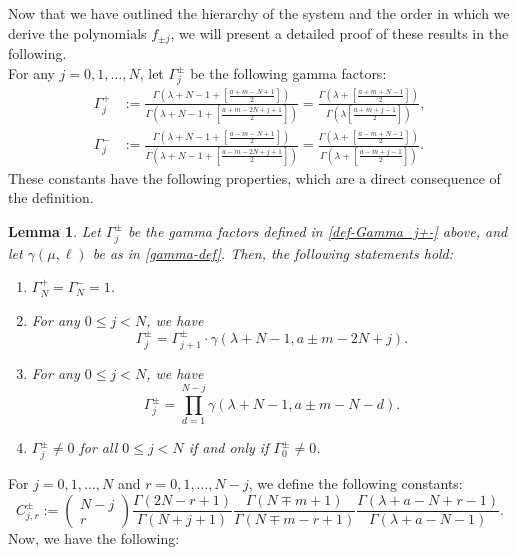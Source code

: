 \documentclass[12pt, pdflatex, a4paper]{article}
\theoremstyle{plain}
\newtheorem{lemma}[thm]{Lemma}
\theoremstyle{definition}
\begin{document}
Now that we have outlined the hierarchy of the system and the order in which we derive the polynomials $f_{\pm j}$, we will present a detailed proof of these results in the following.\\

For any $j = 0, 1, \ldots, N$, let $\Gamma_j^\pm$ be the following gamma factors:
\begin{equation}\label{def-Gamma_j+-}
\begin{aligned}
\Gamma_j^+ &:= \frac{\Gamma\left(\lambda+N-1+\left[\frac{a+m-N+1}{2}\right]\right)}{\Gamma\left(\lambda+N-1+\left[\frac{a+m-2N+j+1}{2}\right]\right)} = \frac{\Gamma\left(\lambda+\left[\frac{a+m+N-1}{2}\right]\right)}{\Gamma\left(\lambda\left[\frac{a+m+j-1}{2}\right]\right)},\\[4pt]
\Gamma_j^- &:= \frac{\Gamma\left(\lambda+N-1+\left[\frac{a-m-N+1}{2}\right]\right)}{\Gamma\left(\lambda+N-1+\left[\frac{a-m-2N+j+1}{2}\right]\right)} = \frac{\Gamma\left(\lambda+\left[\frac{a-m+N-1}{2}\right]\right)}{\Gamma\left(\lambda+\left[\frac{a-m+j-1}{2}\right]\right)}.
\end{aligned}
\end{equation}
These constants have the following properties, which are a direct consequence of the definition.

\begin{lemma}\label{lemma-Gamma_j+-} Let $\Gamma_j^\pm$ be the gamma factors defined in \eqref{def-Gamma_j+-} above, and let $\gamma(\mu, \ell)$ be as in \eqref{gamma-def}. Then, the following statements hold:
\begin{enumerate}[label=\normalfont{(\arabic*)}]
\item $\Gamma_N^+ = \Gamma_N^- = 1$.
\item For any $0 \leq j < N$, we have
\begin{equation*}
\Gamma_j^\pm = \Gamma_{j+1}^\pm \cdot \gamma(\lambda+N-1, a\pm m-2N+j).
\end{equation*}
\item For any $0 \leq j < N$, we have 
\begin{equation*}
\Gamma_j^\pm = \prod_{d=1}^{N-j}\gamma(\lambda+N-1, a\pm m-N-d).
\end{equation*}
\item $\Gamma_j^\pm \neq 0$ for all $0 \leq j < N$ if and only if $\Gamma_0^\pm \neq 0$.
\end{enumerate}
\end{lemma}


For $j = 0, 1, \dots, N$ and $r = 0, 1, \ldots, N-j$, we define the following constants:
\begin{equation}\label{definition-constants-Cjr+-}
C_{j, r}^\pm := \begin{pmatrix}
N-j\\
r
\end{pmatrix}
\frac{\Gamma(2N-r+1)}{\Gamma(N+j+1)}
\frac{\Gamma(N\mp m+1)}{\Gamma(N\mp m -r +1)}
\frac{\Gamma(\lambda+a-N+r-1)}{\Gamma(\lambda+a-N-1)}.
\end{equation}
Now, we have the following:
\end{document}

